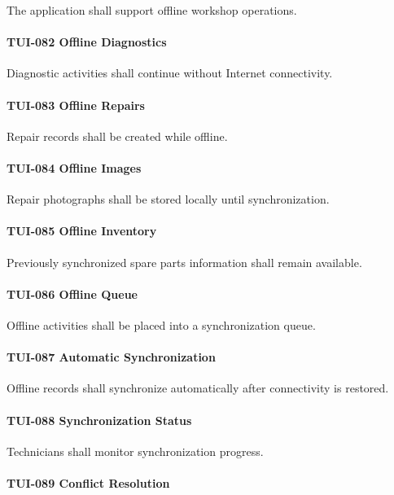 The application shall support offline workshop operations.

\paragraph{TUI-082 Offline Diagnostics}

Diagnostic activities shall continue without Internet connectivity.

\paragraph{TUI-083 Offline Repairs}

Repair records shall be created while offline.

\paragraph{TUI-084 Offline Images}

Repair photographs shall be stored locally until synchronization.

\paragraph{TUI-085 Offline Inventory}

Previously synchronized spare parts information shall remain available.

\paragraph{TUI-086 Offline Queue}

Offline activities shall be placed into a synchronization queue.

\paragraph{TUI-087 Automatic Synchronization}

Offline records shall synchronize automatically after connectivity is
restored.

\paragraph{TUI-088 Synchronization Status}

Technicians shall monitor synchronization progress.

\paragraph{TUI-089 Conflict Resolution}

